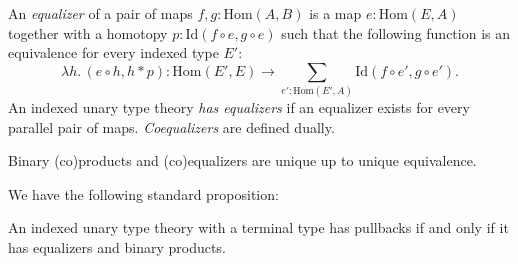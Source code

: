 \documentclass[reqno]{mscs}
\newcommand{\fs}[1]{\mathrm{#1}}
\newcommand{\Hom}{\fs{Hom}}
\newcommand{\Id}{\fs{Id}}
\numberwithin{figure}{section}
\begin{document}
An \emph{equalizer} of a pair of maps $f,g : \Hom(A,B)$ is a map $e : \Hom(E,A)$ together with a homotopy $p : \Id(f \circ e, g \circ e)$
such that the following function is an equivalence for every indexed type $E'$:
\[ \lambda h.\,(e \circ h, h * p) : \Hom(E', E) \to \sum_{e' : \Hom(E',A)} \Id(f \circ e', g \circ e'). \]
An indexed unary type theory \emph{has equalizers} if an equalizer exists for every parallel pair of maps.
\emph{Coequalizers} are defined dually.

\begin{remark}
Binary (co)products and (co)equalizers are unique up to unique equivalence.
\end{remark}

We have the following standard proposition:

\begin{prop}
An indexed unary type theory with a terminal type has pullbacks if and only if it has equalizers and binary products.
\end{prop}
\end{document}
